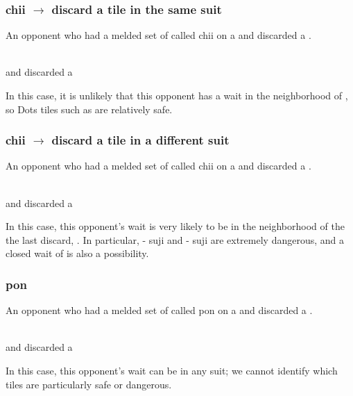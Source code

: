 {{\subsubsection*{ {\jap chii} $\rightarrow$ discard a tile in the same suit}
An opponent who had a melded set of {\large\fa} called {\jap chii} on a {\large{}} and discarded a {\large{}}. 
\begin{screen}
\bp
{}
~\rfa\fa\fa\\{\normalsize and discarded a} 
\ep
\end{screen}
In this case, it is unlikely that this opponent has a wait in the neighborhood of {\large{}}, so Dots tiles such as {\large{}} are relatively safe. 

\subsubsection*{ {\jap chii} $\rightarrow$ discard a tile in a different suit}
An opponent who had a melded set of {\large\fa} called {\jap chii} on a {\large{}} and discarded a {\large{}}. 
\begin{screen}
\bp
{}
~\rfa\fa\fa\\{\normalsize and discarded a} 
\ep
\end{screen}
In this case, this opponent's wait is very likely to be in the neighborhood of the the last discard, {\large{}}. In particular, {\large{}-} {\jap suji} and {\large{}-} {\jap suji} are extremely dangerous, and a closed wait of {\large{}} is also a possibility. 

\subsubsection*{ {\jap pon}}
An opponent who had a melded set of {\large\fa} called {\jap pon} on a {\large{}} and discarded a {\large{}}. 
\begin{screen}
\bp
{}
~\rfa\fa\fa\\{\normalsize and discarded a} 
\ep
\end{screen}
In this case, this opponent's wait can be in any suit; we cannot identify which tiles are particularly safe or dangerous. 

}}
